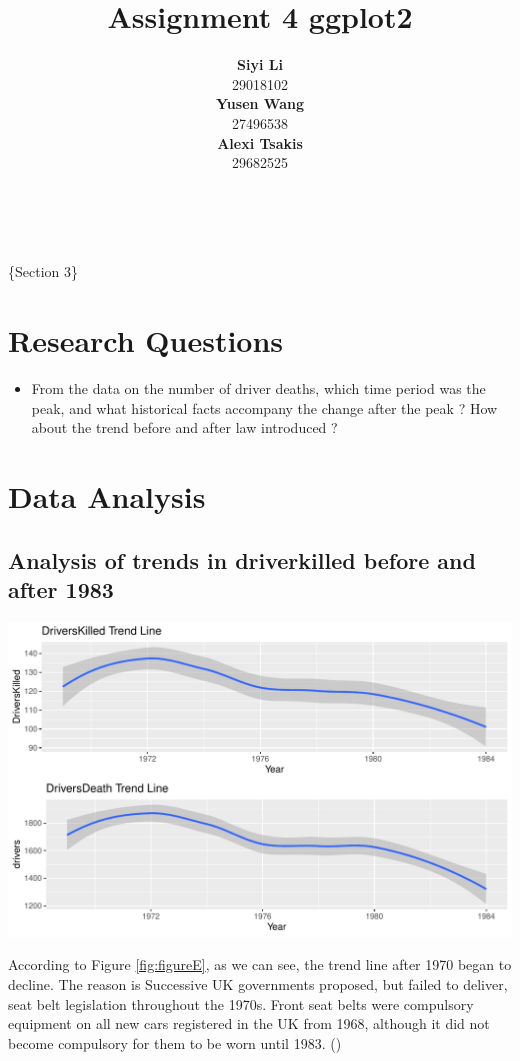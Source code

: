 \documentclass[11pt,a4paper,]{article}
\title{Assignment 4 ggplot2}
\author{\sf\Large\textbf{ Siyi Li}\\ {\sf\large 29018102\\[0.5cm]} \sf\Large\textbf{ Yusen Wang}\\ {\sf\large 27496538\\[0.5cm]} \sf\Large\textbf{ Alexi Tsakis}\\ {\sf\large 29682525\\[0.5cm]}}
\date{\sf\Date~\Month~\Year}
\makeatletter
\providecommand{\tightlist}{%
  \setlength{\itemsep}{0pt}\setlength{\parskip}{0pt}}
\def\titlepage{\front{\expandafter{\@title}}{\@author}{\@organization}}
\makeatother
\begin{document}
\titlepage

\{Section 3\}

\hypertarget{research-questions}{%
\section{Research Questions}\label{research-questions}}

\begin{itemize}
\tightlist
\item
  From the data on the number of driver deaths, which time period was the peak, and what historical facts accompany the change after the peak ? How about the trend before and after law introduced ?
\end{itemize}

\hypertarget{data-analysis}{%
\section{Data Analysis}\label{data-analysis}}

\hypertarget{analysis-of-trends-in-driverkilled-before-and-after-1983}{%
\subsection{Analysis of trends in driverkilled before and after 1983}\label{analysis-of-trends-in-driverkilled-before-and-after-1983}}

\includegraphics{report_files/figure-latex/figureE-1.pdf}

According to Figure \ref{fig:figureE}, as we can see, the trend line after 1970 began to decline. The reason is Successive UK governments proposed, but failed to deliver, seat belt legislation throughout the 1970s. Front seat belts were compulsory equipment on all new cars registered in the UK from 1968, although it did not become compulsory for them to be worn until 1983. (\cite{richens2000condoms}) \clearpage
\end{document}
